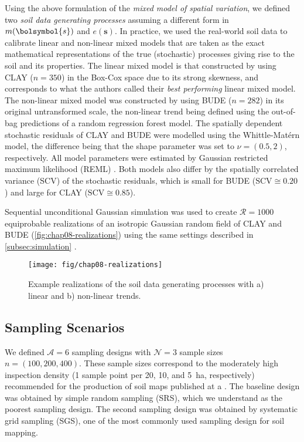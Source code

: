 Using the above formulation of the \emph{mixed model of spatial variation}, we defined two \emph{soil 
data generating processes} assuming a different form in $m(\bolsymbol{s})$ and $e(\boldsymbol{s})$. In 
practice, we used the real-world soil data to calibrate linear and non-linear mixed models that are taken as 
the exact mathematical representations of the true (stochastic) processes giving rise to the soil and its 
properties. The linear mixed model is that constructed by \citet{Samuel-RosaEtAl2015} using CLAY ($n = 350$) in 
the Box-Cox space due to its strong skewness, and corresponds to what the authors called their \emph{best 
performing} linear mixed model. The non-linear mixed model was constructed by \citet{Samuel-RosaEtAl} using 
BUDE ($n = 282$) in its original untransformed scale, the non-linear trend being defined using the out-of-bag 
predictions of a random regression forest model. The spatially dependent stochastic residuals of CLAY and BUDE 
were modelled using the Whittle-Matérn model, the difference being that the shape parameter was set to $\nu = 
(0.5, 2)$, respectively. All model parameters were estimated by Gaussian restricted maximum likelihood (REML) 
\cite{LarkEtAl2004, DiggleEtAl2007}. Both models also differ by the spatially correlated variance (SCV) of the 
stochastic residuals, which is small for BUDE ($\text{SCV} \cong 0.20$) and large for CLAY ($\text{SCV} \cong 
0.85$).

Sequential unconditional Gaussian simulation was used to create $\mathcal{R} = 1000$ equiprobable realizations 
of an isotropic Gaussian random field of CLAY and BUDE (\autoref{fig:chap08-realizations}) using the same 
settings described in \autoref{subsec:simulation} \cite{Samuel-RosaEtAl}.
 
\begin{figure}[!ht]
 \centering
 \texttt{[image: fig/chap08-realizations]}
 \caption{Example realizations of the soil data generating processes with a) linear and b) non-linear trends.}
 \label{fig:chap08-realizations}
\end{figure}

\subsection{Sampling Scenarios}

We defined $\mathcal{A} = 6$ sampling designs with $\mathcal{N} = 3$ sample sizes $n = (100, 200, 400)$. These 
sample sizes correspond to the moderately high inspection density (1 sample point per 20, 10, and 
\SI{5}{\hectare}, respectively) recommended for the production of soil maps published at a  
\cite{Rossiter, 2000}. The baseline design was obtained by simple random sampling (SRS), which we understand as 
the poorest sampling design. The second sampling design was obtained by systematic grid sampling (SGS), one of 
the most commonly used sampling design for soil mapping.

